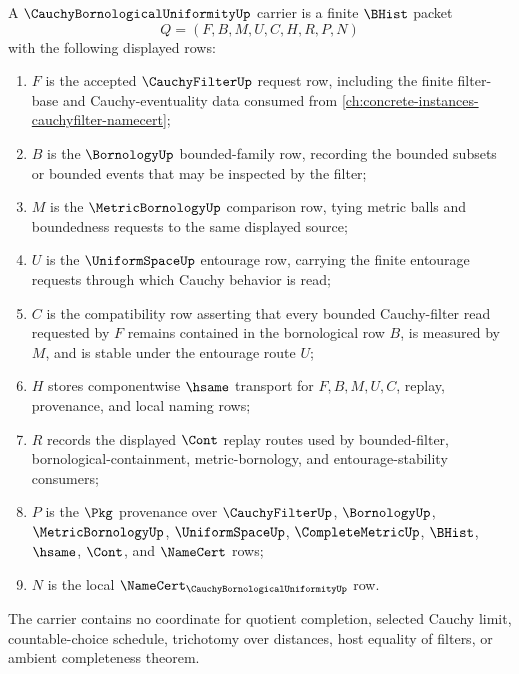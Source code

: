 \begin{definition}
\label{def:cauchy-bornological-uniformity-carrier}
A $\CauchyBornologicalUniformityUp$ carrier is a finite $\BHist$ packet
$$
Q=(F,B,M,U,C,H,R,P,N)
$$
with the following displayed rows:
\begin{enumerate}
\item $F$ is the accepted $\CauchyFilterUp$ request row, including the finite filter-base and Cauchy-eventuality data consumed from \autoref{ch:concrete-instances-cauchyfilter-namecert};
\item $B$ is the $\BornologyUp$ bounded-family row, recording the bounded subsets or bounded events that may be inspected by the filter;
\item $M$ is the $\MetricBornologyUp$ comparison row, tying metric balls and boundedness requests to the same displayed source;
\item $U$ is the $\UniformSpaceUp$ entourage row, carrying the finite entourage requests through which Cauchy behavior is read;
\item $C$ is the compatibility row asserting that every bounded Cauchy-filter read requested by $F$ remains contained in the bornological row $B$, is measured by $M$, and is stable under the entourage route $U$;
\item $H$ stores componentwise $\hsame$ transport for $F,B,M,U,C$, replay, provenance, and local naming rows;
\item $R$ records the displayed $\Cont$ replay routes used by bounded-filter, bornological-containment, metric-bornology, and entourage-stability consumers;
\item $P$ is the $\Pkg$ provenance over $\CauchyFilterUp$, $\BornologyUp$, $\MetricBornologyUp$, $\UniformSpaceUp$, $\CompleteMetricUp$, $\BHist$, $\hsame$, $\Cont$, and $\NameCert$ rows;
\item $N$ is the local $\NameCert_{\CauchyBornologicalUniformityUp}$ row.
\end{enumerate}
The carrier contains no coordinate for quotient completion, selected Cauchy limit, countable-choice schedule, trichotomy over distances, host equality of filters, or ambient completeness theorem.
\end{definition}

